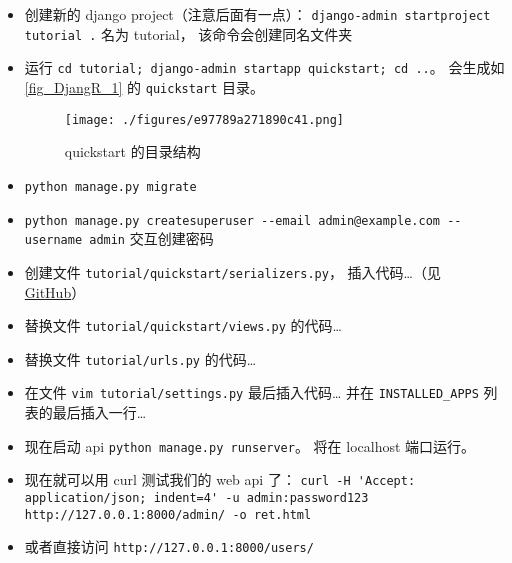 \begin{itemize}
\item 创建新的 django project（注意后面有一点）： \verb|django-admin startproject tutorial .| 名为 tutorial， 该命令会创建同名文件夹
\item 运行 \verb|cd tutorial; django-admin startapp quickstart; cd ..|。 会生成如\autoref{fig_DjangR_1} 的 \verb|quickstart| 目录。
\begin{figure}[ht]
\centering
\texttt{[image: ./figures/e97789a271890c41.png]}
\caption{quickstart 的目录结构} \label{fig_DjangR_1}
\end{figure}
\item \verb|python manage.py migrate|
\item \verb|python manage.py createsuperuser --email admin@example.com --username admin| 交互创建密码
\item 创建文件 \verb|tutorial/quickstart/serializers.py|， 插入代码…（见 \href{https://github.com/MacroUniverse/django-test}{GitHub}）
\item 替换文件 \verb|tutorial/quickstart/views.py| 的代码…
\item 替换文件 \verb|tutorial/urls.py| 的代码…
\item 在文件 \verb|vim tutorial/settings.py| 最后插入代码… 并在 \verb|INSTALLED_APPS| 列表的最后插入一行…
\item 现在启动 api \verb|python manage.py runserver|。 将在 localhost 端口运行。
\item 现在就可以用 curl 测试我们的 web api 了： \verb|curl -H 'Accept: application/json; indent=4' -u admin:password123 http://127.0.0.1:8000/admin/ -o ret.html|
\item 或者直接访问 \verb|http://127.0.0.1:8000/users/|
\end{itemize}

